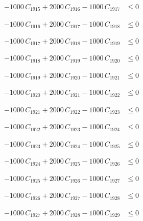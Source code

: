 \documentclass[a4paper,11pt]{article}
\begin{document}
\begin{align}
-1000\,C_{1915} + 2000\,C_{1916} - 1000\,C_{1917} &\leq 0 \nonumber
\end{align}

\begin{align}
-1000\,C_{1916} + 2000\,C_{1917} - 1000\,C_{1918} &\leq 0 \nonumber
\end{align}

\begin{align}
-1000\,C_{1917} + 2000\,C_{1918} - 1000\,C_{1919} &\leq 0 \nonumber
\end{align}

\begin{align}
-1000\,C_{1918} + 2000\,C_{1919} - 1000\,C_{1920} &\leq 0 \nonumber
\end{align}

\begin{align}
-1000\,C_{1919} + 2000\,C_{1920} - 1000\,C_{1921} &\leq 0 \nonumber
\end{align}

\begin{align}
-1000\,C_{1920} + 2000\,C_{1921} - 1000\,C_{1922} &\leq 0 \nonumber
\end{align}

\begin{align}
-1000\,C_{1921} + 2000\,C_{1922} - 1000\,C_{1923} &\leq 0 \nonumber
\end{align}

\begin{align}
-1000\,C_{1922} + 2000\,C_{1923} - 1000\,C_{1924} &\leq 0 \nonumber
\end{align}

\begin{align}
-1000\,C_{1923} + 2000\,C_{1924} - 1000\,C_{1925} &\leq 0 \nonumber
\end{align}

\begin{align}
-1000\,C_{1924} + 2000\,C_{1925} - 1000\,C_{1926} &\leq 0 \nonumber
\end{align}

\begin{align}
-1000\,C_{1925} + 2000\,C_{1926} - 1000\,C_{1927} &\leq 0 \nonumber
\end{align}

\begin{align}
-1000\,C_{1926} + 2000\,C_{1927} - 1000\,C_{1928} &\leq 0 \nonumber
\end{align}

\begin{align}
-1000\,C_{1927} + 2000\,C_{1928} - 1000\,C_{1929} &\leq 0 \nonumber
\end{align}
\end{document}
